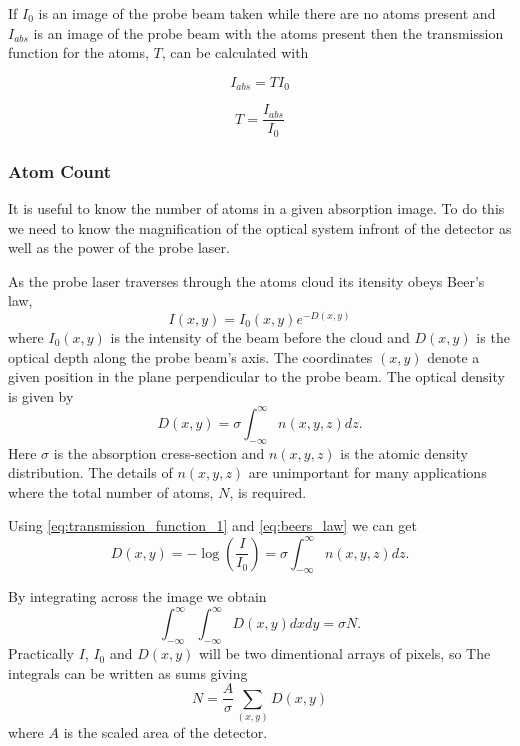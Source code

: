 If $I_0$ is an image of the probe beam taken while there are no atoms present and $I_{abs}$ is an image of the probe beam with the atoms present then the transmission function for the atoms, $T$, can be calculated with

\begin{equation}\label{eq:transmission_function_1}
I_{abs} = T I_0
\end{equation}

\begin{equation}\label{eq:transmission_function}
T = \frac{I_{abs}}{I_0}
\end{equation}

\subsubsection{Atom Count}


It is useful to know the number of atoms in a given absorption image. To do this we need to know the magnification of the optical system infront of the detector as well as the power of the probe laser.

As the probe laser traverses through the atoms cloud its itensity obeys Beer's law,
\begin{equation}\label{eq:beers_law}
I(x, y) = I_0(x, y)e^{-D(x, y)}
\end{equation}
where $I_0(x, y)$ is the intensity of the beam before the cloud and $D(x, y)$ is the optical depth along the probe beam's axis. The coordinates $(x, y)$ denote a given position in the plane perpendicular to the probe beam. The optical density is given by
\begin{equation}\label{eq:optical_density}
D(x, y) = \sigma \int_{-\infty}^{\infty}n(x, y, z)dz.
\end{equation}
Here $\sigma$ is the absorption cress-section and $n(x, y, z)$ is the atomic density distribution. The details of $n(x, y, z)$ are unimportant for many applications where the total number of atoms, $N$, is required.

Using \ref{eq:transmission_function_1} and \ref{eq:beers_law} we can get
\begin{equation}
D(x, y) = -\log(\frac{I}{I_0}) = \sigma \int_{-\infty}^{\infty} n(x, y, z) dz.
\end{equation}

By integrating across the image we obtain
\begin{equation}
\int_{-\infty}^{\infty} \int_{-\infty}^{\infty} D(x, y) dx dy = \sigma N.
\end{equation}
Practically $I$, $I_0$ and $D(x, y)$ will be two dimentional arrays of pixels, so The integrals can be written as sums giving
\begin{equation}
N = \frac{A}{\sigma} \sum_{(x, y)} D(x, y)
\end{equation}
where $A$ is the scaled area of the detector.

